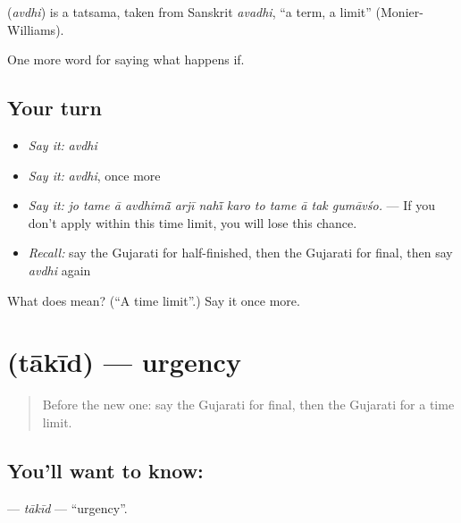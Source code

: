 \begin{cousinweb}
\textbf{} (\emph{avdhi}) is a tatsama, taken from Sanskrit \emph{avadhi}, \textquotedblleft{}a term, a limit\textquotedblright{} (Monier-Williams).
\end{cousinweb}

\begin{grammarlens}[title={What you've built}]
One more word for saying what happens if.
\end{grammarlens}

\subsection*{Your turn}
\begin{itemize}
\raggedright
  \item \emph{Say it:} \emph{avdhi}
  \item \emph{Say it:} \emph{avdhi}, once more
  \item \emph{Say it:} \emph{jo tame ā avdhimā̃ arjī nahī̃ karo to tame ā tak gumāvśo.} — If you don't apply within this time limit, you will lose this chance.
  \item \emph{Recall:} say the Gujarati for half-finished, then the Gujarati for final, then say \emph{avdhi} again
\end{itemize}

\begin{tcolorbox}[breakable,colback=teal!4,colframe=teal!35!black,title={Before you move on}]
What does  mean? (\textquotedblleft{}A time limit\textquotedblright{}.) Say it once more.
\end{tcolorbox}
\section[\texorpdfstring{\gu{તાકીદ} (tākīd)}{તાકીદ (tākīd)}]{ (tākīd) — urgency}

\label{lesson:GU-C530-takid}



\begin{quote}
Before the new one: say the Gujarati for final, then the Gujarati for a time limit.
\end{quote}

\subsection*{You'll want to know: }
\textbf{} — \emph{tākīd} — \textquotedblleft{}urgency\textquotedblright{}.

